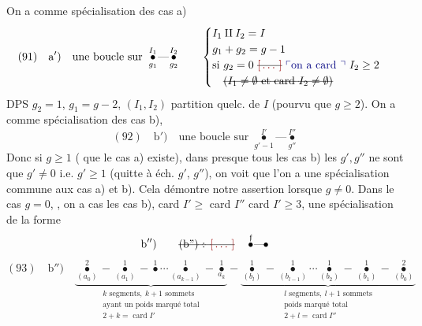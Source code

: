\documentclass[11pt,a4paper]{article}
\begin{document}
On a comme spécialisation des cas a)
\[
(91)\quad \text{a}')\quad
\text{une boucle sur } \overset{I_1}{\underset{g_1}{\bullet}}\!\text{---}\!\overset{I_2}{\underset{g_2}{\bullet}}
\qquad
\begin{cases}
I_1 \amalg I_2 = I \\
g_1 + g_2 = g - 1 \\
\text{si } g_2 = 0 \text{ \struck{\ill{}}}\ \text{\add{on a card } } I_2 \geq 2 \\
\quad \text{\struck{($I_1 \neq \emptyset$ et card $I_2 \neq \emptyset$)}}
\end{cases}
\]
\struck{\ill{}} DPS $g_2 = 1$, $g_1 = g - 2$, $(I_1, I_2)$ partition quelc. de $I$ (pourvu que $g \geq 2$).
On a comme  spécialisation des cas b), 
\[
(92)\quad \text{b}')\quad
\text{une boucle sur } \overset{I'}{\underset{g'-1}{\bullet}}\!\text{---}\!\overset{I''}{\underset{g''}{\bullet}}
\]
Donc si $g \geq 1$ (  que le cas a) existe), dans presque tous les cas b)  les  \ill{}  $g', g''$ ne sont que $g' \neq 0$ i.e. $g' \geq 1$ (quitte à éch. $g'$, $g''$), on voit que l'on a  une spécialisation commune aux cas a) et b). Cela démontre notre assertion lorsque $g \neq 0$.  Dans le cas $g = 0$, ,  on a cas les cas b),    card $I' \geq$ card $I''$  card $I' \geq 3$, une spécialisation de la forme
\[
\text{b}'')\qquad
\text{\struck{(b'') : \ill{}}}\quad
\overset{\mathfrak{f}}{\bullet}\!\text{---}\!\bullet
\]
\[
(93)\quad \text{b}'')\quad
\underbrace{\overset{2}{\underset{(a_0)}{\bullet}}\!-\!\overset{1}{\underset{(a_1)}{\bullet}}\!-\!\overset{1}{\bullet}\cdots\overset{1}{\underset{(a_{k-1})}{\bullet}}\!-\!\overset{1}{\underset{a_k}{\bullet}}}_{\substack{k \text{ segments},\ k+1 \text{ sommets} \\ \text{ayant un poids marqué total} \\ 2 + k = \operatorname{card} I'}}
\!-\!
\underbrace{\overset{1}{\underset{(b_l)}{\bullet}}\!-\!\overset{1}{\underset{(b_{l-1})}{\bullet}}\cdots\overset{1}{\underset{(b_2)}{\bullet}}\!-\!\overset{1}{\underset{(b_1)}{\bullet}}\!-\!\overset{2}{\underset{(b_0)}{\bullet}}}_{\substack{l \text{ segments},\ l+1 \text{ sommets} \\ \text{poids marqué total} \\ 2 + l = \operatorname{card} I''}}
\]
\end{document}
